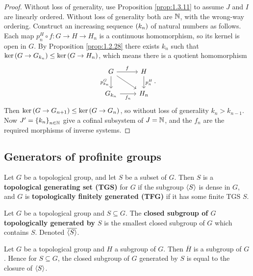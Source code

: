 \begin{proof}
Without loss of generality, use Proposition \ref{prop:1.3.11} to assume $ J $ and $ I $ are linearly ordered. Without loss of generality both are $ \mathbb{N} $, with the wrong-way ordering. Construct an increasing sequence $ \br{k_n} $ of natural numbers as follows. Each map $ p_n^H \circ f : G \to H \to H_n $ is a continuous homomorphism, so its kernel is open in $ G $. By Proposition \ref{prop:1.2.28} there exists $ k_n $ such that $ \ker \br{G \to G_{k_n}} \le \ker \br{G \to H_n} $, which means there is a quotient homomorphism
$$
\begin{tikzcd}
G \arrow{r}{f} \arrow{d}[swap]{p_{k_n}^G} \arrow{dr} & H \arrow{d}{p_n^H} \\
G_{k_n} \arrow{r}[swap]{f_n} & H_n
\end{tikzcd}.
$$
Then $ \ker \br{G \to G_{n + 1}} \le \ker \br{G \to G_n} $, so without loss of generality $ k_n > k_{n - 1} $. Now $ J' = \cbr{k_n}_{n \in \NN} $ give a cofinal subsystem of $ J = \mathbb{N} $, and the $ f_n $ are the required morphisms of inverse systems.
\end{proof}

\subsection{Generators of profinite groups}

\begin{definition*}
Let $ G $ be a topological group, and let $ S $ be a subset of $ G $. Then $ S $ is a \textbf{topological generating set (TGS)} for $ G $ if the subgroup $ \left\langle S \right\rangle $ is dense in $ G $, and $ G $ is \textbf{topologically finitely generated (TFG)} if it has some finite TGS $ S $.
\end{definition*}

\pagebreak

\begin{definition*}
Let $ G $ be a topological group and $ S \subseteq G $. The \textbf{closed subgroup of $ G $ topologically generated by $ S $} is the smallest closed subgroup of $ G $ which contains $ S $. Denoted $ \overline{\left\langle S \right\rangle} $.
\end{definition*}

\begin{proposition}
Let $ G $ be a topological group and $ H $ a subgroup of $ G $. Then $ \overline{H} $ is a subgroup of $ G $. Hence for $ S \subseteq G $, the closed subgroup of $ G $ generated by $ S $ is equal to the closure of $ \left\langle S \right\rangle $.
\end{proposition}

